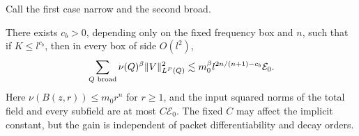 Call the first case narrow and the second broad.

\begin{lemma}\label{s:broad}
There exists $c_b>0$, depending only on the fixed frequency box and
$n$, such that if $K\le l^{c_b}$, then in every box of side $O(l^2)$,
\begin{equation}\label{s:broad-bound}
 \sum_{Q\text{ broad}}\nu(Q)^\beta\lVert V\rVert_{L^P(Q)}^2
       \lesssim m_0^\beta l^{2n/(n+1)-c_b}\mathcal E_0.
\end{equation}
Here $\nu(B(z,r))\le m_0r^n$ for $r\ge1$, and the input squared
norms of the total field and every subfield are at most $C\mathcal E_0$.
The fixed $C$ may affect the implicit constant, but the gain is
independent of packet differentiability and decay orders.
\end{lemma}

